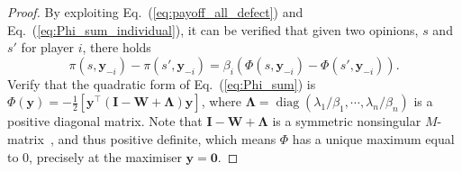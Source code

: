 \documentclass[letterpaper, 10 pt, conference]{ieeeconf}  %
\newcommand{\vect}[1]{\boldsymbol{#1}}
\newcommand{\mat}[1]{\boldsymbol{#1}}
\DeclareMathOperator{\diag}{\text{diag}}
\renewcommand{\eqref}[1]{Eq.~(\ref{#1})}  %
\begin{document}
\begin{proof}
By exploiting \eqref{eq:payoff_all_defect} and \eqref{eq:Phi_sum_individual}, it can be verified that given two opinions, $s$ and $s'$ for player $i$, there holds
\begin{equation}\label{eq:payoff_potential}
    \pi(s,\vect{y}_{-i}) - \pi(s',\vect{y}_{-i}) = \beta_i(\Phi(s, \vect{y}_{-i}) - \Phi(s', \vect{y}_{-i})).
\end{equation}
Verify that the quadratic form of \eqref{eq:Phi_sum} is $\Phi(\vect y) = -\frac{1}{2} [ \vect y^\top(\mat I - \mat W + \mat{\Lambda})\vect y]$,
where $\mat{\Lambda} = \diag(\lambda_1/\beta_1, \cdots,\lambda_n/\beta_n)$ is a positive diagonal matrix. Note that $\mat I - \mat W + \mat \Lambda$ is a symmetric nonsingular $M$-matrix~\cite[Theorem~4.31]{qu2009cooperative_book}, and thus positive definite, which means $\Phi$ has a unique maximum equal to $0$, precisely at the maximiser $\vect y = \vect 0$.



\end{proof}
\end{document}
